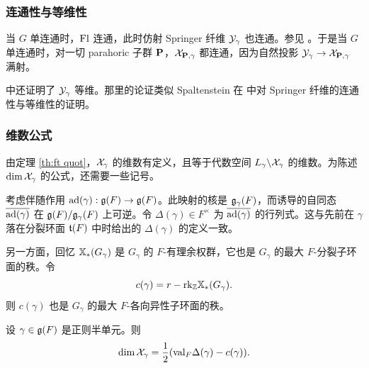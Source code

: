 \subsubsection{连通性与等维性}\label{sss:equidim} 当 $G$ 单连通时，$\textup{Fl}$ 连通，此时仿射 Springer 纤维 $\mathcal{Y}_{\gamma}$ 也连通。参见 \cite[\S4, 引理 2]{KL}。于是当 $G$ 单连通时，对一切 parahoric 子群 $\mathbf{P}$，$\mathcal{X}_{\mathbf{P},\gamma}$ 都连通，因为自然投影 $\mathcal{Y}_{\gamma}\to \mathcal{X}_{\mathbf{P},\gamma}$ 满射。

\cite{KL} 中还证明了 $\mathcal{Y}_{\gamma}$ 等维。那里的论证类似 Spaltenstein 在 \cite{Spa77} 中对 Springer 纤维的连通性与等维性的证明。

\subsubsection{维数公式}
由定理 \ref{th:ft quot}，$\mathcal{X}_{\gamma}$ 的维数有定义，且等于代数空间 $L_{\gamma}\backslash\mathcal{X}_{\gamma}$ 的维数。为陈述 $\dim\mathcal{X}_{\gamma}$ 的公式，还需要一些记号。

考虑伴随作用 $\textup{ad}(\gamma):\mathfrak{g}(F)\to \mathfrak{g}(F)$。此映射的核是 $\mathfrak{g}_{\gamma}(F)$，而诱导的自同态 $\overline{\textup{ad}(\gamma)}$ 在 $\mathfrak{g}(F)/\mathfrak{g}_{\gamma}(F)$ 上可逆。令 $\Delta(\gamma)\in F^{\times}$ 为 $\overline{\textup{ad}(\gamma)}$ 的行列式。这与先前在 $\gamma$ 落在分裂环面 $\mathfrak{t}(F)$ 中时给出的 $\Delta(\gamma)$ 的定义一致。

另一方面，回忆 $\mathbb{X}_*(G_{\gamma})$ 是 $G_{\gamma}$ 的 $F$-有理余权群，它也是 $G_{\gamma}$ 的最大 $F$-分裂子环面的秩。令
\begin{equation*}
c(\gamma)=r-\textup{rk}_{\mathbb{Z}}\mathbb{X}_*(G_{\gamma}).
\end{equation*}
则 $c(\gamma)$ 也是 $G_{\gamma}$ 的最大 $F$-各向异性子环面的秩。

\begin{theorem}\label{th:aff dim} 设 $\gamma\in \mathfrak{g}(F)$ 是正则半单元。则
\begin{equation}\label{aff Spr dim}
\dim\mathcal{X}_{\gamma}=\frac{1}{2}(\textup{val}_{F}\Delta(\gamma)-c(\gamma)).
\end{equation}
\end{theorem}

